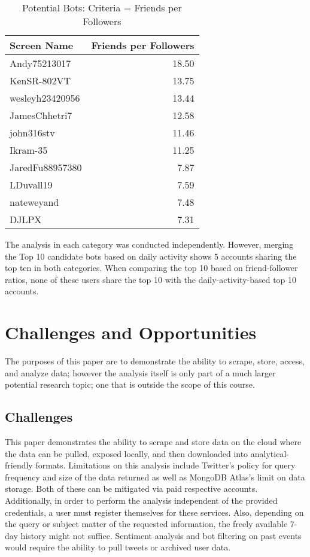 \begin{table}[htb]
\centering
\caption{Potential Bots: Criteria = Friends per Followers}
\label{t:ratio-top10}
\begin{tabular}{lr}
Screen Name & Friends per Followers \\
\toprule
Andy75213017    & 18.50 \\
KenSR-802VT     & 13.75 \\
wesleyh23420956 & 13.44 \\
JamesChhetri7   & 12.58 \\
john316stv      & 11.46 \\
Ikram-35        & 11.25 \\
JaredFu88957380 & 7.87 \\
LDuvall19       & 7.59 \\
nateweyand      & 7.48 \\
DJLPX           & 7.31  
\end{tabular}
\end{table}

The analysis in each category was conducted independently. However, merging the
Top 10 candidate bots based on daily activity shows 5 accounts sharing the top
ten in both categories. When comparing the top 10 based on friend-follower
ratios, none of these users share the top 10 with the daily-activity-based top
10 accounts.

\section{Challenges and Opportunities}

The purposes of this paper are to demonstrate the ability to scrape, store,
access, and analyze data; however the analysis itself is only part of a much
larger potential research topic; one that is outside the scope of this course. 

\subsection{Challenges}

This paper demonstrates the ability to scrape and store data on the cloud where
the data can be pulled, exposed locally, and then downloaded into
analytical-friendly formats. Limitations on this analysis include Twitter's
policy for query frequency and size of the data returned as well as MongoDB
Atlas's limit on data storage. Both of these can be mitigated via paid
respective accounts. Additionally, in order to perform the analysis independent
of the provided credentials, a user must register themselves for these
services.  Also, depending on the query or subject matter of the requested
information, the freely available 7-day history might not suffice. Sentiment
analysis and bot filtering on past events would require the ability to pull
tweets or archived user data. 

